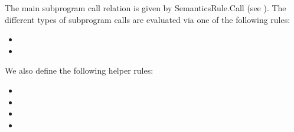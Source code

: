 The main subprogram call relation is given by
SemanticsRule.Call (see ).
%
The different types of subprogram calls are evaluated via one of the following rules:
\begin{itemize}
\item {}
\item {}
\end{itemize}

We also define the following helper rules:
\begin{itemize}
  \item {}
  \item {}
  \item {}
  \item {}
\end{itemize}

